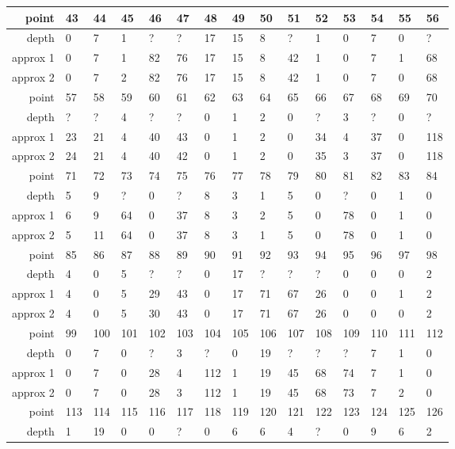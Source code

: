 \begin{center}
\begin{supertabular}{|r|l l l l l l l l l l l l l l|}
\hline
point & 43 & 44 & 45 & 46 & 47 & 48 & 49 & 50 & 51 & 52 & 53 & 54 & 55 & 56 \\
\hline
depth & 0 & 7 & 1 & ? & ? & 17 & 15 & 8 & ? & 1 & 0 & 7 & 0 & ? \\
approx 1 & 0 & 7 & 1 & 82 & 76 & 17 & 15 & 8 & 42 & 1 & 0 & 7 & 1 & 68 \\
approx 2 & 0 & 7 & 2 & 82 & 76 & 17 & 15 & 8 & 42 & 1 & 0 & 7 & 0 & 68 \\
\hline
point & 57 & 58 & 59 & 60 & 61 & 62 & 63 & 64 & 65 & 66 & 67 & 68 & 69 & 70 \\
\hline
depth & ? & ? & 4 & ? & ? & 0 & 1 & 2 & 0 & ? & 3 & ? & 0 & ? \\
approx 1 & 23 & 21 & 4 & 40 & 43 & 0 & 1 & 2 & 0 & 34 & 4 & 37 & 0 & 118 \\
approx 2 & 24 & 21 & 4 & 40 & 42 & 0 & 1 & 2 & 0 & 35 & 3 & 37 & 0 & 118 \\
\hline
point & 71 & 72 & 73 & 74 & 75 & 76 & 77 & 78 & 79 & 80 & 81 & 82 & 83 & 84 \\
\hline
depth & 5 & 9 & ? & 0 & ? & 8 & 3 & 1 & 5 & 0 & ? & 0 & 1 & 0 \\
approx 1 & 6 & 9 & 64 & 0 & 37 & 8 & 3 & 2 & 5 & 0 & 78 & 0 & 1 & 0 \\
approx 2 & 5 & 11 & 64 & 0 & 37 & 8 & 3 & 1 & 5 & 0 & 78 & 0 & 1 & 0 \\
\hline
point & 85 & 86 & 87 & 88 & 89 & 90 & 91 & 92 & 93 & 94 & 95 & 96 & 97 & 98 \\
\hline
depth & 4 & 0 & 5 & ? & ? & 0 & 17 & ? & ? & ? & 0 & 0 & 0 & 2 \\
approx 1 & 4 & 0 & 5 & 29 & 43 & 0 & 17 & 71 & 67 & 26 & 0 & 0 & 1 & 2 \\
approx 2 & 4 & 0 & 5 & 30 & 43 & 0 & 17 & 71 & 67 & 26 & 0 & 0 & 0 & 2 \\
\hline
point & 99 & 100 & 101 & 102 & 103 & 104 & 105 & 106 & 107 & 108 & 109 & 110 & 111 & 112 \\
\hline
depth & 0 & 7 & 0 & ? & 3 & ? & 0 & 19 & ? & ? & ? & 7 & 1 & 0 \\
approx 1 & 0 & 7 & 0 & 28 & 4 & 112 & 1 & 19 & 45 & 68 & 74 & 7 & 1 & 0 \\
approx 2 & 0 & 7 & 0 & 28 & 3 & 112 & 1 & 19 & 45 & 68 & 73 & 7 & 2 & 0 \\
\hline
point & 113 & 114 & 115 & 116 & 117 & 118 & 119 & 120 & 121 & 122 & 123 & 124 & 125 & 126 \\
\hline
depth & 1 & 19 & 0 & 0 & ? & 0 & 6 & 6 & 4 & ? & 0 & 9 & 6 & 2 \\

\end{supertabular}
\end{center}
